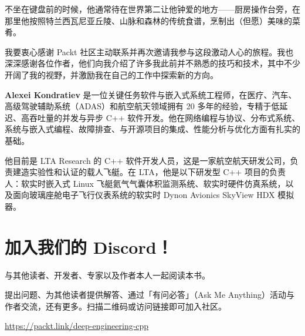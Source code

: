 不坐在键盘前的时候，他通常待在世界第二让他钟爱的地方——厨房操作台旁，在那里他按照特兰西瓦尼亚丘陵、山脉和森林的传统食谱，烹制出（但愿）美味的菜肴。

我要衷心感谢 Packt 社区主动联系并再次邀请我参与这段激动人心的旅程。我也深深感谢各位作者，他们向我介绍了许多我此前并不熟悉的技巧和技术，其中不少开阔了我的视野，并激励我在自己的工作中探索新的方向。

\textbf{Alexei Kondratiev} 是一位关键任务软件与嵌入式系统工程师，在医疗、汽车、高级驾驶辅助系统（ADAS）和航空航天领域拥有 20 多年的经验，专精于低延迟、高吞吐量的并发与异步 C++ 软件开发。他在网络编程与协议、分布式系统、系统与嵌入式编程、故障排查、与开源项目的集成、性能分析与优化方面有扎实的基础。

他目前是 LTA Research 的 C++ 软件开发人员，这是一家航空航天研发公司，负责建造实验性和认证的载人飞艇。在 LTA，他是以下研发型 C++ 项目的负责人：软实时嵌入式 Linux 飞艇氦气气囊体积监测系统、软实时硬件仿真系统，以及面向玻璃座舱电子飞行仪表系统的软实时 Dynon Avionics SkyView HDX 模拟器。

\section*{\textbf{加入我们的 Discord！}}

与其他读者、开发者、专家以及作者本人一起阅读本书。

提出问题、为其他读者提供解答、通过「有问必答」（Ask Me Anything）活动与作者交流，还有更多。扫描二维码或访问链接即可加入社区。


\href{https://packt.link/deep-engineering-cpp}{https://packt.link/deep-engineering-cpp}
